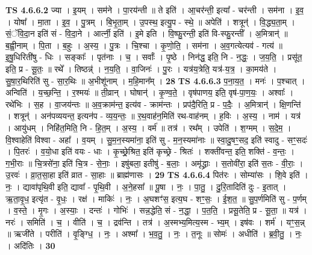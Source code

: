 \documentclass[17pt]{extarticle}
\begin{document}
                  \newline
                                \textbf{ TS 4.6.6.2} \newline
                  ज्या । इ॒यम् । सम॑ने । पा॒रय॑न्ती ॥ ते इति॑ । आ॒चर॑न्ती॒ इत्या᳚ - चर॑न्ती । सम॑ना । इ॒व॒ । योषा᳚ । मा॒ता । इ॒व॒ । पु॒त्रम् । बि॒भृ॒ता॒म् । उ॒पस्थ॒ इत्यु॒प - स्थे॒ ॥ अपेति॑ । शत्रून्॑ । वि॒द्ध्य॒ता॒म् । सं॒ॅवि॒दा॒न इति॑ सं - वि॒दा॒ने । आर्त्नी॒ इति॑ । इ॒मे इति । वि॒ष्फु॒रन्ती॒ इति॑ वि-स्फु॒रन्ती᳚ । अ॒मित्रान्॑ ॥ ब॒ह्वी॒नाम् । पि॒ता । ब॒हुः । अ॒स्य॒ । पु॒त्रः । चि॒श्चा । कृ॒णो॒ति॒ । सम॑ना । अ॒व॒गत्येत्यव॑ - गत्य॑ ॥ इ॒षु॒धिरिती॑षु - धिः । सङ्काः᳚ । पृत॑नाः । च॒ । सर्वाः᳚ । पृ॒ष्ठे । निन॑द्ध॒ इति॒ नि - न॒द्धः॒ । ज॒य॒ति॒ । प्रसू॑त॒ इति॒ प्र - सू॒तः॒ ॥ रथे᳚ । तिष्ठन्न्॑ । न॒य॒ति॒ । वा॒जिनः॑ । पु॒रः । यत्र॑य॒त्रेति॒ यत्र॑-य॒त्र॒ । का॒मय॑ते । सु॒षा॒र॒थिरिति॑ सु - सा॒र॒थिः ॥ अ॒भीशू॑नाम् । म॒हि॒मान᳚म् । \textbf{  28} \newline
                  \newline
                                \textbf{ TS 4.6.6.3} \newline
                  प॒ना॒य॒त॒ । मनः॑ । प॒श्चात् । अन्विति॑ । य॒च्छ॒न्ति॒ । र॒श्मयः॑ ॥ ती॒व्रान् । घोषान्॑ । कृ॒ण्व॒ते॒ । वृष॑पाणय॒ इति॒ वृष॑-पा॒ण॒यः॒ । अश्वाः᳚ । रथे॑भिः । स॒ह । वा॒जय॑न्तः ॥ अ॒व॒क्राम॑न्त॒ इत्य॑व - क्राम॑न्तः । प्रप॑दै॒रिति॒ प्र - प॒दैः॒ । अ॒मित्रान्॑ । क्षि॒णन्ति॑ । शत्रून्॑ । अन॑पव्ययन्त॒ इत्यन॑प - व्य॒य॒न्तः॒ ॥ र॒थ॒वाह॑न॒मिति॑ रथ-वाह॑नम् । ह॒विः । अ॒स्य॒ । नाम॑ । यत्र॑ । आयु॑धम् । निहि॑त॒मिति॒ नि - हि॒त॒म् । अ॒स्य॒ । वर्म॑ ॥ तत्र॑ । रथ᳚म् । उपेति॑ । श॒ग्मम् । स॒दे॒म॒ । वि॒श्वाहेति॑ विश्वा - अहा᳚ । व॒यम् । सु॒म॒न॒स्यमा॑ना॒ इति॑ सु - म॒न॒स्यमा॑नाः ॥ स्वा॒दु॒षꣳ॒॒सद॒ इति॑ स्वादु - सꣳ॒॒सदः॑ । पि॒तरः॑ । व॒यो॒धा इति॑ वयः - धाः । कृ॒च्छ्रे॒श्रित॒ इति॑ कृच्छ्रे - श्रितः॑ । शक्ती॑वन्त॒ इति॒ शक्ति॑ - व॒न्तः॒ । ग॒भी॒राः ॥ चि॒त्रसे॑ना॒ इति॑ चि॒त्र - से॒नाः॒ । इषु॑बला॒ इतीषु॑ - ब॒लाः॒ । अमृ॑द्ध्राः । स॒तोवी॑रा॒ इति॑ स॒तः - वी॒राः॒ । उ॒रवः॑ । व्रा॒त॒सा॒हा इति॑ व्रात - सा॒हाः ॥ ब्राह्म॑णासः । \textbf{  29} \newline
                  \newline
                                \textbf{ TS 4.6.6.4} \newline
                  पित॑रः । सोम्या॑सः । शि॒वे इति॑ । नः॒ । द्यावा॑पृथि॒वी इति॒ द्यावा᳚ - पृ॒थि॒वी । अ॒ने॒हसा᳚ ॥ पू॒षा । नः॒ । पा॒तु॒ । दु॒रि॒तादिति॑ दुः - इ॒तात् । ऋ॒ता॒वृ॒ध॒ इत्यृ॑त - वृ॒धः॒ । रक्ष॑ । माकिः॑ । नः॒ । अ॒घशꣳ॑स॒ इत्य॒घ - शꣳ॒॒सः॒ । ई॒श॒त॒ ॥ सु॒प॒र्णमिति॑ सु - प॒र्णम् । व॒स्ते॒ । मृ॒गः । अ॒स्याः॒ । दन्तः॑ । गोभिः॑ । सन्न॒द्धेति॒ सं - न॒द्धा॒ । प॒त॒ति॒ । प्रसू॒तेति॒ प्र - सू॒ता॒ ॥ यत्र॑ । नरः॑ । समिति॑ । च॒ । वीति॑ । च॒ । द्रव॑न्ति । तत्र॑ । अ॒स्मभ्य॒मित्य॒स्म - भ्य॒म् । इष॑वः । शर्म॑ । यꣳ॒॒स॒न्न् ॥ ऋजी॑ते । परीति॑ । वृ॒ङ्ग्धि॒ । नः॒ । अश्मा᳚ । भ॒व॒तु॒ । नः॒ । त॒नूः ॥ सोमः॑ । अधीति॑ । ब्र॒वी॒तु॒ । नः॒ । अदि॑तिः । \textbf{  30} \newline
\end{document}
